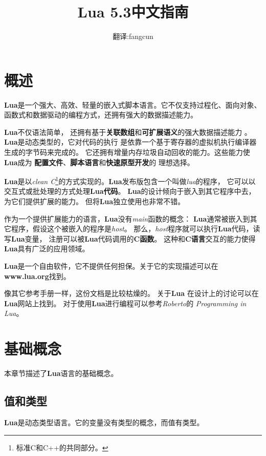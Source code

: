 \documentclass{ctexart}
\title{Lua 5.3中文指南}
\author{翻译:fangcun}
\begin{document}
\maketitle
\newpage
\tableofcontents
\newpage
\section{概述}

\textbf{Lua}是一个强大、高效、轻量的嵌入式脚本语言。它不仅支持过程化、面向对象、函数式和数据驱动的编程方式，还拥有强大的数据描述能力。

\textbf{Lua}不仅语法简单，
还拥有基于\textbf{关联数组}和\textbf{可扩展语义}的强大数据描述能力
。\textbf{Lua}是动态类型的，它对代码的执行
是依靠一个基于寄存器的虚拟机执行编译器生成的字节码来完成的。
它还拥有增量内存垃圾自动回收的能力。这些能力使\textbf{Lua}成为
\textbf{配置文件}、\textbf{脚本语言}和\textbf{快速原型开发}的
理想选择。

\textbf{Lua}是以\emph{clean C}\footnote{标准C和C++的共同部分。
}的方式实现的。\textbf{Lua}发布版包含一个叫做\emph{lua}的程序，
它可以以交互式或批处理的方式处理\textbf{Lua代码}。
\textbf{Lua}的设计倾向于嵌入到其它程序中去，为它们提供扩展的能力。
但将\textbf{Lua}独立使用也非常不错。

作为一个提供扩展能力的语言，\textbf{Lua}没有\emph{main}函数的概念：
\textbf{Lua}通常被嵌入到其它程序，假设这个被嵌入的程序是\emph{host}。
那么，\emph{host}程序就可以执行\textbf{Lua}代码，读写\textbf{Lua}变量，
注册可以被\textbf{Lua}代码调用的\textbf{C函数}。
这种和\textbf{C语言}交互的能力使得\textbf{Lua}具有广泛的应用领域。

\textbf{Lua}是一个自由软件，它不提供任何担保。关于它的实现描述可以在
\textbf{www.lua.org}找到。

像其它参考手册一样，这份文档是比较枯燥的。
关于\textbf{Lua}
在设计上的讨论可以在\textbf{Lua}网站上找到。
对于使用\textbf{Lua}进行编程可以参考\emph{Roberto}的
\emph{Programming in Lua}。

\section{基础概念}

本章节描述了\textbf{Lua}语言的基础概念。 

\subsection{值和类型}

\textbf{Lua}是动态类型语言。它的变量没有类型的概念，而值有类型。
\end{document}
